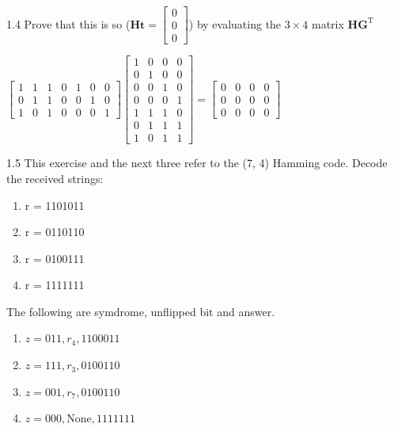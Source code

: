 \documentclass[12pt, a4paper]{article}
\begin{document}
\begin{prob}{1.4}
    Prove that this is so 
    ($\mathbf{Ht} = 
        \begin{bmatrix}
            0 \\ 0 \\ 0
        \end{bmatrix}$) 
    by evaluating the $3 \times 4$ matrix $\mathbf{HG}^{\mathrm{T}}$
\end{prob}
\begin{sol}
    $
    \begin{bmatrix}
        1 & 1 & 1 & 0 & 1 & 0 & 0 \\
        0 & 1 & 1 & 0 & 0 & 1 & 0 \\
        1 & 0 & 1 & 0 & 0 & 0 & 1 
    \end{bmatrix}
        \begin{bmatrix}
        1 & 0 & 0 & 0 \\
        0 & 1 & 0 & 0 \\
        0 & 0 & 1 & 0 \\
        0 & 0 & 0 & 1 \\
        1 & 1 & 1 & 0 \\
        0 & 1 & 1 & 1 \\
        1 & 0 & 1 & 1
    \end{bmatrix}
    = 
    \begin{bmatrix}
        0 & 0 & 0 & 0 \\
        0 & 0 & 0 & 0 \\
        0 & 0 & 0 & 0
    \end{bmatrix}
    $

\end{sol}
\bigskip

\begin{prob}{1.5}
    This exercise and the next three refer to the (7, 4) Hamming code. Decode the received strings:
    \begin{enumerate}
        \item[(a)] r = 1101011
        \item[(b)] r = 0110110
        \item[(c)] r = 0100111
        \item[(d)] r = 1111111
    \end{enumerate}
\end{prob}
\begin{sol} 
    The following are symdrome, unflipped bit and answer.
    \begin{enumerate}
        \item[(a)] $z = 011, r_4, 1100011 $
        \item[(b)] $z = 111, r_3, 0100110$
        \item[(c)] $z = 001, r_7, 0100110$
        \item[(d)] $z = 000, \text{None}, 1111111$
    \end{enumerate}
\end{sol}
\bigskip
\end{document}
